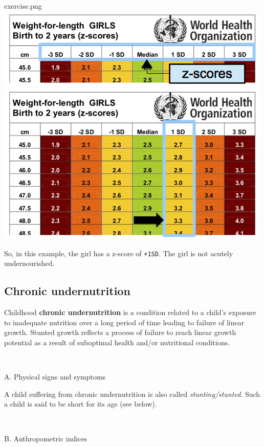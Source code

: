 \documentclass[
  12pt,
]{book}
\newenvironment{rmdexercise}
  {\begin{tcolorbox}[width=\textwidth, 
                     colback = {white}, 
                     title = {\textbf{Exercise}}, 
                     colbacktitle = lightgray,
                     coltitle = black]
  \begin{includegraphics}[scale = 1]{exercise.png}}
  {\end{includegraphics}
  \end{tcolorbox}}
\begin{document}
\begin{rmdexercise}
\includegraphics{images/whzRefTable02.png} \includegraphics{images/whzRefTable02a.png}

So, in this example, the girl has a z-score of \texttt{+1SD}. The girl is not acutely undernourished.
\end{rmdexercise}

\hypertarget{chronic-undernutrition}{%
\subsection{Chronic undernutrition}\label{chronic-undernutrition}}

Childhood \textbf{chronic undernutrition} is a condition related to a child's exposure to inadequate nutrition over a long period of time leading to failure of linear growth. Stunted growth reflects a process of failure to reach linear growth potential as a result of suboptimal health and/or nutritional conditions.

~

A. Physical signs and symptoms

A child suffering from chronic undernutrition is also called \emph{stunting/stunted}. Such a child is said to be short for its age (see below).

~

B. Anthropometric indices
\end{document}
